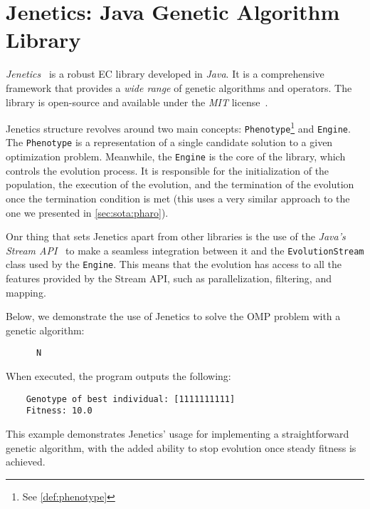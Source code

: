 \section{Jenetics: Java Genetic Algorithm Library}
\label{sec:sota:jenetics}

  \emph{Jenetics}~\autocite{wilhelmstotterJeneticsJavaGenetica} is a robust
  EC library developed in \textit{Java}.
  It is a comprehensive framework that provides a \textit{wide range} of genetic
  algorithms and operators.
  The library is open-source and available under the \textit{MIT} 
  license~\autocite{MITLicense2006}.

  Jenetics structure revolves around two main concepts: 
  \texttt{Phenotype}\footnote{See \vref{def:phenotype}} and \texttt{Engine}.
  The \texttt{Phenotype} is a representation of a single candidate solution to
  a given optimization problem.
  Meanwhile, the \texttt{Engine} is the core of the library, which controls the
  evolution process.
  It is responsible for the initialization of the population, the execution of
  the evolution, and the termination of the evolution once the termination
  condition is met (this uses a very similar approach to the one we presented 
  in \vref{sec:sota:pharo}).

  Onr thing that sets Jenetics apart from other libraries is the use of the
  \textit{Java's Stream API}~\autocite{StreamJavaPlatform} to make a seamless
  integration between it and the \texttt{EvolutionStream} class used by the
  \texttt{Engine}.
  This means that the evolution has access to all the features provided by the
  Stream API, such as parallelization, filtering, and mapping.

  Below, we demonstrate the use of Jenetics to solve the OMP problem with a
  genetic algorithm:

  \begin{src}
    \label{src:sota:jenetics:example}
    \begin{verbatim}
      N
    \end{verbatim}
  \end{src}

  When executed, the program outputs the following:

  \begin{verbatim}
    Genotype of best individual: [1111111111]
    Fitness: 10.0
  \end{verbatim}

  This example demonstrates Jenetics' usage for implementing a straightforward
  genetic algorithm, with the added ability to stop evolution once steady
  fitness is achieved.

